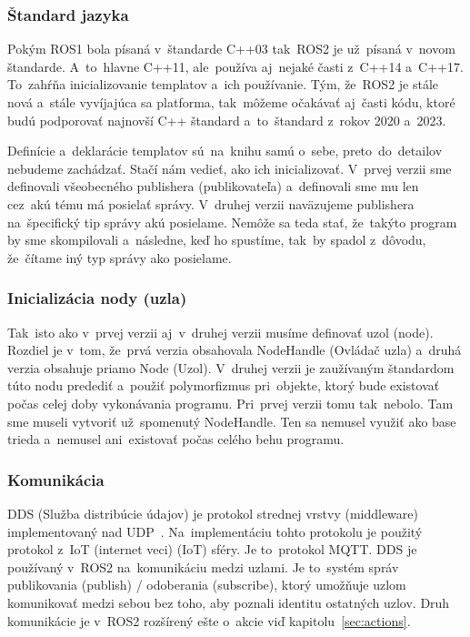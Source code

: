 \subsubsection{Štandard jazyka}

	Pokým ROS1 bola písaná v~štandarde C++03 tak~ROS2 je už~písaná v~novom štandarde. A~to~hlavne C++11, ale~používa aj~nejaké časti z~C++14
	a~C++17. To~zahŕňa inicializovanie templatov a~ich používanie. Tým, že~ROS2 je stále nová a~stále vyvíjajúca sa platforma, tak~môžeme očakávať aj~časti
	kódu, ktoré budú podporovať najnovší C++ štandard a~to~štandard z~rokov 2020 a~2023.

	Definície a~deklarácie templatov sú~na~knihu samú o~sebe, preto~do~detailov nebudeme zachádzať. Stačí nám vedieť, ako ich inicializovať.
	V~prvej verzii sme definovali všeobecného publishera (publikovateľa) a~definovali sme mu len cez~akú tému má posielať správy. V~druhej verzii
	naväzujeme publishera na~špecifický tip správy akú posielame. Nemôže sa teda stať, že~takýto program by sme skompilovali a~následne, keď
	ho spustíme, tak~by spadol z~dôvodu, že~čítame iný typ správy ako posielame.

\subsubsection{Inicializácia nody (uzla)}

	Tak~isto ako v~prvej verzii aj~v~druhej verzii musíme definovať uzol (node). Rozdiel je v~tom, že~prvá verzia obsahovala NodeHandle (Ovládač uzla)
	a~druhá verzia obsahuje priamo Node (Uzol). V~druhej verzii je zaužívaným štandardom túto nodu predediť a~použiť polymorfizmus pri~objekte,
	ktorý bude existovať počas celej doby vykonávania programu. Pri~prvej verzii tomu tak~nebolo. Tam sme museli vytvoriť už~spomenutý NodeHandle.
	Ten sa nemusel využiť ako base trieda a~nemusel ani~existovať počas celého behu programu.

\subsubsection{Komunikácia}

	DDS (Služba distribúcie údajov) je protokol strednej vrstvy (middleware) implementovaný nad UDP~\cite{ROS2book}. Na~implementáciu tohto protokolu
	je použitý protokol z~IoT (internet veci) (\acrlong{IoT}) sféry. Je to~protokol MQTT. DDS je používaný v~ROS2 na~komunikáciu medzi uzlami. Je
	to~systém správ publikovania (publish) / odoberania (subscribe), ktorý umožňuje uzlom komunikovať medzi sebou bez toho, aby poznali identitu
	ostatných uzlov. Druh komunikácie je v~ROS2 rozšírený ešte o~akcie viď kapitolu~\ref{sec:actions}.


